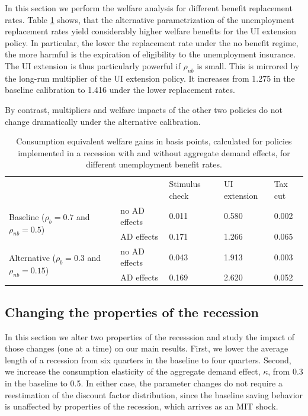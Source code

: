 \documentclass[../HAFiscal]{subfiles}
\begin{document}
In this section we perform the welfare analysis for different benefit replacement rates. Table \ref{tab:robustness_benefit_results} shows, that the alternative parametrization of the unemployment replacement rates yield considerably higher welfare benefits for the UI extension policy. In particular, the lower the replacement rate under the no benefit regime, the more harmful is the expiration of eligibility to the unemployment insurance. The UI extension is thus particularly powerful if $\rho_{nb}$ is small. This is mirrored by the long-run multiplier of the UI extension policy. It increases from 1.275 in the baseline calibration to 1.416 under the lower replacement rates.

By contrast, multipliers and welfare impacts of the other two policies do not change dramatically under the alternative calibration. 


\begin{table}[]
	\begin{center}
		\begin{tabular}{@{}lllll@{}}
			\toprule
			&                    & Stimulus check & UI extension & Tax cut \\ \cmidrule(l){1-5} 
			\multirow{2}{*}{Baseline  ($\rho_{b}=0.7$ and $\rho_{nb}=0.5$)} 	& no AD effects & 0.011          & 0.580        & 0.002   \\
																				& AD effects    & 0.171          & 1.266        & 0.065   \\
			\multirow{2}{*}{Alternative  ($\rho_{b}=0.3$ and $\rho_{nb}=0.15$)} & no AD effects & 0.043          & 1.913        & 0.003   \\
																				& AD effects    & 0.169          & 2.620        & 0.052   \\ \cmidrule(l){1-5} 
		\end{tabular}
		\caption{Consumption equivalent welfare gains in basis points, calculated for policies implemented in a recession with and without aggregate demand effects, for different unemployment benefit rates.}
		\label{tab:robustness_benefit_results}
	\end{center}
\end{table}




\FloatBarrier
\subsection{Changing the properties of the recession}

In this section we alter two properties of the recesssion and study the impact of those changes (one at a time) on our main results. First, we lower the average length of a recession from six quarters in the baseline to four quarters. Second, we increase the consumption elasticity of the aggregate demand effect, $\kappa$, from 0.3 in the baseline to 0.5. In either case, the parameter changes do not require a reestimation of the discount factor distribution, since the baseline saving behavior is unaffected by properties of the recession, which arrives as an MIT shock. 
\end{document}
